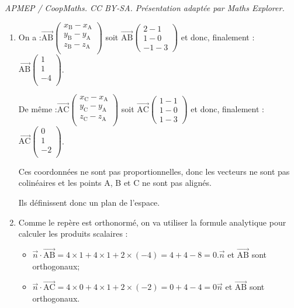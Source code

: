 \documentclass[10pt]{article}
\providecommand{\vect}[1]{\overrightarrow{#1}}
\providecommand{\vectt}[1]{\overrightarrow{\mathrm{#1}}}
\begin{document}
\noindent\textit{APMEP / CoopMaths. CC BY-SA. Présentation adaptée par Maths Explorer.}\par\medskip
\begin{enumerate}
	\item  On a :\quad $\vectt{AB}
	\begin{pmatrix}
		x_\mathrm{B} - x_\mathrm{A}\\
		y_\mathrm{B} - y_\mathrm{A}\\
		z_\mathrm{B} - z_\mathrm{A}\\
	\end{pmatrix}$ \quad soit \quad
	$\vectt{AB}
	\begin{pmatrix}
		2- 1\\
		1-0\\
		-1-3
	\end{pmatrix}$
	\quad et donc, finalement :\quad
	$\vectt{AB}
	\begin{pmatrix}
		1\\
		1\\
		-4\\
	\end{pmatrix}$.

	De même :\quad $\vectt{AC}
	\begin{pmatrix}
		x_\mathrm{C} - x_\mathrm{A}\\
		y_\mathrm{C} - y_\mathrm{A}\\
		z_\mathrm{C} - z_\mathrm{A}\\
	\end{pmatrix}$ \quad soit \quad
	$\vectt{AC}
	\begin{pmatrix}
		1 - 1\\
		1- 0\\
		1-3
	\end{pmatrix}$
	\quad et donc, finalement :\quad
	$\vectt{AC}
	\begin{pmatrix}
		0\\
		1\\
		-2\\
	\end{pmatrix}$.

	Ces coordonnées ne sont pas proportionnelles, donc les vecteurs ne sont pas colinéaires et les points A, B et C ne sont pas alignés.

	Ils définissent donc un plan de l'espace.

	\item Comme le repère est orthonormé, on va utiliser la formule analytique pour calculer les produits scalaires :

	\begin{itemize}[label=\textbullet]
		\item $\vect{n} \cdot \vectt{AB} = 4 \times 1 + 4 \times 1 + 2 \times (-4) = 4 + 4 -8 =0$.\quad $\vect{n}$ et $\vectt{AB}$ sont orthogonaux;
		\item $\vect{n} \cdot \vectt{AC} = 4 \times 0 +4 \times 1 + 2 \times (-2) = 0 + 4 -4 =  0$\quad $\vect{n}$ et $\vectt{AB}$ sont orthogonaux.
	\end{itemize}


\end{enumerate}
\end{document}
